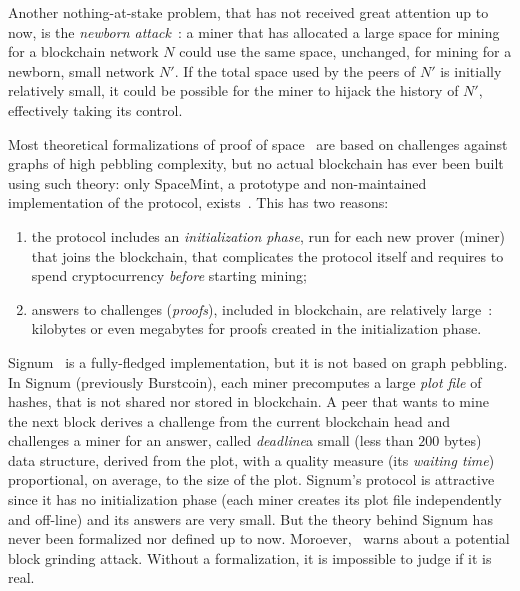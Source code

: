Another nothing-at-stake problem, that has not received great attention up to now,
is the \emph{newborn attack}~\cite{TangZDWLG0L19}: a miner that has allocated a large space
for mining for a blockchain network $N$ could use the same space, unchanged, for
mining for a newborn, small network $N'$. If the total space used by the peers of $N'$ is
initially relatively small, it could be possible for the miner to hijack the history of $N'$,
effectively taking its control.

Most theoretical formalizations of proof of space~\cite{AtenieseBFG14,DziembowskiFKP15,RenD16} are
based on challenges against graphs of high pebbling complexity, but
no actual blockchain has ever been built using such theory: only SpaceMint, a prototype and non-maintained
implementation of the protocol, exists~\cite{ParkKFGAP18}. This has two reasons:
%
\begin{enumerate}
\item the protocol includes an \emph{initialization phase},
  run for each new prover (miner) that joins the blockchain,
  that complicates the protocol itself and
  requires to spend cryptocurrency \emph{before}
  starting mining;
\item answers to challenges (\emph{proofs}),
  included in blockchain, are relatively large~\cite{AbusalahACKPR17}:
  kilobytes or even megabytes for proofs created in the initialization phase.
\end{enumerate}

Signum~\cite{Signum} is a fully-fledged implementation, but it is not based on graph pebbling.
In Signum (previously Burstcoin),
each miner precomputes a large \emph{plot file} of hashes, that is not shared nor
stored in blockchain.
A peer that wants to mine the next block derives a challenge from the current blockchain head
and challenges a miner for an answer, called
\emph{deadline}\ie a small (less than $200$ bytes) data structure, derived from the plot,
with a quality measure
(its \emph{waiting time}) proportional, on average, to the size of the plot.
Signum's protocol is attractive since it has no initialization phase (each miner creates its plot file
independently and off-line) and its answers are very small.
But the theory behind Signum has never been formalized nor defined up to now.
Moroever, \cite{ParkKFGAP18}~warns about a potential block grinding attack.
Without a formalization, it is impossible to judge if it is real.

